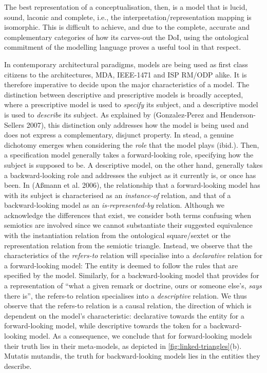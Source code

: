 \documentclass[a4paper,11pt,oneside,oldfontcommands]{memoir}
\newcounter{para}
\theoremstyle{definition}
\theoremstyle{break}		%
\numberwithin{equation}{chapter}
\numberwithin{figure}{chapter}
\begin{document}
The best representation of a conceptualisation, then, is a model that is
lucid, sound, laconic and complete, i.e., the
interpretation/representation mapping is isomorphic. This is difficult
to achieve, and due to the complete, accurate and complementary
categories of how its carves-out the DoI, using the ontological
commitment of the modelling language proves a useful tool in that
respect.

In contemporary architectural paradigms, models are being used as first
class citizens to the architectures, MDA, IEEE-1471 and ISP RM/ODP
alike. It is therefore imperative to decide upon the major
characteristics of a model. The distinction between descriptive and
prescriptive models is broadly accepted, where a prescriptive model is
used to \emph{specify} its subject, and a descriptive model is used to
\emph{describe} its subject. As explained by (Gonzalez-Perez and
Henderson-Sellers 2007), this distinction only addresses how the model
is being used and does not express a complementary, disjunct property.
In stead, a genuine dichotomy emerges when considering the \emph{role}
that the model plays (ibid.). Then, a specification model generally
takes a forward-looking role, specifying how the subject is supposed to
be. A descriptive model, on the other hand, generally takes a
backward-looking role and addresses the subject as it currently is, or
once has been. In (Aßmann et al. 2006), the relationship that a
forward-looking model has with its subject is characterised as an
\emph{instance-of} relation, and that of a backward-looking model as an
\emph{is-represented-by} relation. Although we acknowledge the
differences that exist, we consider both terms confusing when semiotics
are involved since we cannot substantiate their suggested equivalence
with the instantiation relation from the ontological square/sextet or
the representation relation from the semiotic triangle. Instead, we
observe that the characteristics of the \emph{refers-to} relation will
specialise into a \emph{declarative} relation for a forward-looking
model: The entity is deemed to follow the rules that are specified by
the model. Similarly, for a backward-looking model that provides for a
representation of ``what a given remark or doctrine, ours or someone
else's, \emph{says} there is'', the refers-to relation specialises into
a \emph{descriptive} relation. We thus observe that the refers-to
relation is a causal relation, the direction of which is dependent on
the model's characteristic: declarative towards the entity for a
forward-looking model, while descriptive towards the token for a
backward-looking model. As a consequence, we conclude that for
forward-looking models their truth lies in their meta-models, as
depicted in \cref{fig:linked-triangles}(b). Mutatis mutandis, the truth
for backward-looking models lies in the entities they describe.
\end{document}

